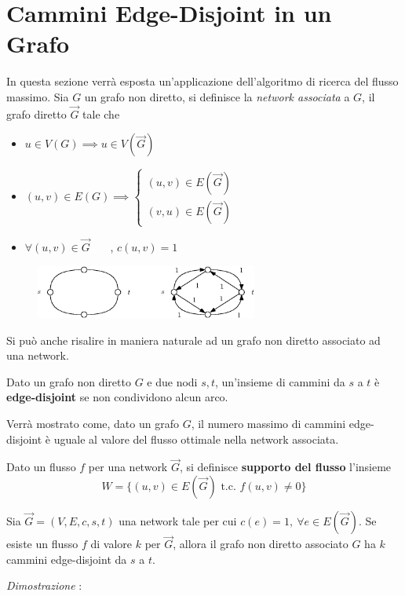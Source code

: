 \documentclass[10pt, letterpaper]{report}
\begin{document}
\section{Cammini Edge-Disjoint in un Grafo}
In questa sezione verrà esposta un'applicazione dell'algoritmo di ricerca del flusso massimo. Sia $G$ un grafo non diretto, si definisce la \textit{network associata} a $G$, il grafo diretto $\vec G$ tale che\begin{itemize}
    \item $u\in V(G)\implies u\in V(\vec G)$
    \item $(u,v)\in E(G)\implies \begin{cases}
        (u,v)\in E(\vec G)\\ 
        (v,u)\in E(\vec G)
    \end{cases}$
    \item $\forall (u,v)\in \vec G$ \ \ \ , $c(u,v)=1$
\end{itemize}
\begin{figure}[h!]
    \centering 
    \includegraphics[width=0.65\textwidth ]{images/networkAssociata.eps}
\end{figure}
Si può anche risalire in maniera naturale ad un grafo non diretto associato ad una network.
\begin{definizione}
    Dato un grafo non diretto $G$ e due nodi $s,t$, un'insieme di cammini da $s$ a $t$ è \textbf{edge-disjoint} se non condividono alcun arco.
\end{definizione}
Verrà mostrato come, dato un grafo $G$, il numero massimo di cammini edge-disjoint è uguale al valore del flusso ottimale nella network associata.
\begin{definizione}
    Dato un flusso $f$ per una network $\vec G$, si definisce \textbf{supporto del flusso} l'insieme $$W=\{(u,v)\in E(\vec G) \text{ t.c. }f(u,v)\ne 0\} $$
\end{definizione}
\begin{proposizione}
    Sia $\vec G = (V,E,c,s,t)$ una network tale per cui $c(e)=1,\ \forall e\in E(\vec G)$. Se esiste un flusso $f$ di valore $k$ per $\vec G$, allora il grafo non diretto associato $G$ ha $k$ cammini edge-disjoint da $s$ a $t$.
\end{proposizione}
\textit{Dimostrazione} : 
\end{document}
